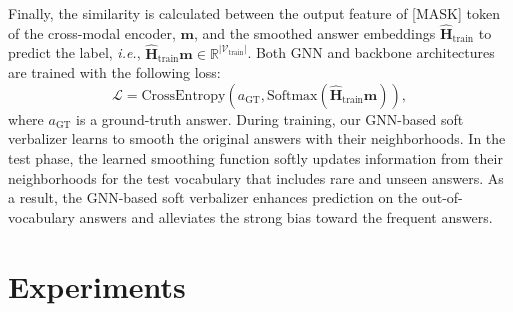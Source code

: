 \documentclass[10pt,twocolumn,letterpaper]{article}
\begin{document}
Finally, the similarity is calculated between the output feature of [MASK] token of the cross-modal encoder, $\mathbf{m}$, and the smoothed answer embeddings $\hat{\mathbf{H}}_\text{train}$ to predict the label, \textit{i.e.}, $\hat{\mathbf{H}}_\text{train} \mathbf{m} \in \mathbb{R}^{|\mathcal{V}_\text{train}|}$.
Both GNN and backbone architectures are trained with the following loss:
\begin{equation}
    \mathcal{L} = \text{CrossEntropy}\left(a_\text{GT}, \text{Softmax}\left(\hat{\mathbf{H}}_\text{train} \mathbf{m}\right) \right),
    \label{eq:loss}
\end{equation}
where $a_\text{GT}$ is a ground-truth answer.
During training, our GNN-based soft verbalizer learns to smooth the original answers with their neighborhoods.
In the test phase, the learned smoothing function softly updates information from their neighborhoods for the test vocabulary that includes rare and unseen answers.
As a result, the GNN-based soft verbalizer enhances prediction on the out-of-vocabulary answers and alleviates the strong bias toward the frequent answers.  \section{Experiments}
\end{document}
